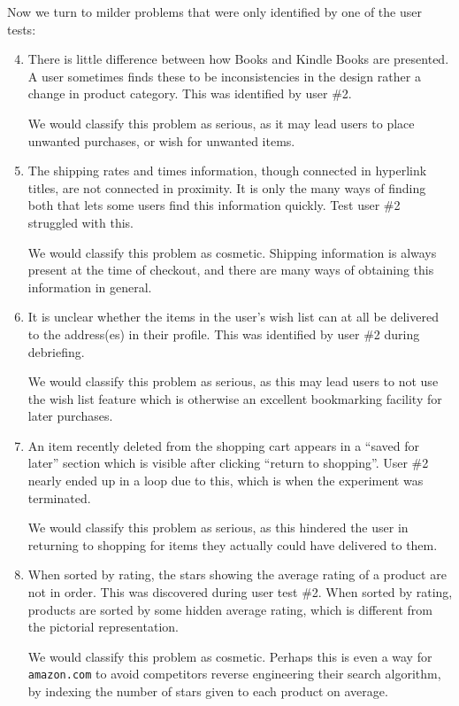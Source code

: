 Now we turn to milder problems that were only identified by one of the user
tests:

\begin{enumerate}

\setcounter{enumi}{3}

\item There is little difference between how Books and Kindle Books are
presented. A user sometimes finds these to be inconsistencies in the design
rather a change in product category. This was identified by user \#2.

We would classify this problem as serious, as it may lead users to place
unwanted purchases, or wish for unwanted items.

\item The shipping rates and times information, though connected in hyperlink
titles, are not connected in proximity. It is only the many ways of finding
both that lets some users find this information quickly. Test user \#2
struggled with this.

We would classify this problem as cosmetic. Shipping information is always
present at the time of checkout, and there are many ways of obtaining this
information in general.

\item It is unclear whether the items in the user's wish list can at all be
delivered to the address(es) in their profile. This was identified by user \#2
during debriefing.

We would classify this problem as serious, as this may lead users to not use
the wish list feature which is otherwise an excellent bookmarking facility for
later purchases.

\item An item recently deleted from the shopping cart appears in a ``saved for
later'' section which is visible after clicking ``return to shopping''. User
\#2 nearly ended up in a loop due to this, which is when the experiment was
terminated.

We would classify this problem as serious, as this hindered the user in
returning to shopping for items they actually could have delivered to them.

\item When sorted by rating, the stars showing the average rating of a product
are not in order. This was discovered during user test \#2. When sorted by
rating, products are sorted by some hidden average rating, which is different
from the pictorial representation.

We would classify this problem as cosmetic. Perhaps this is even a way for
\texttt{amazon.com} to avoid competitors reverse engineering their search
algorithm, by indexing the number of stars given to each product on average.

\end{enumerate}

